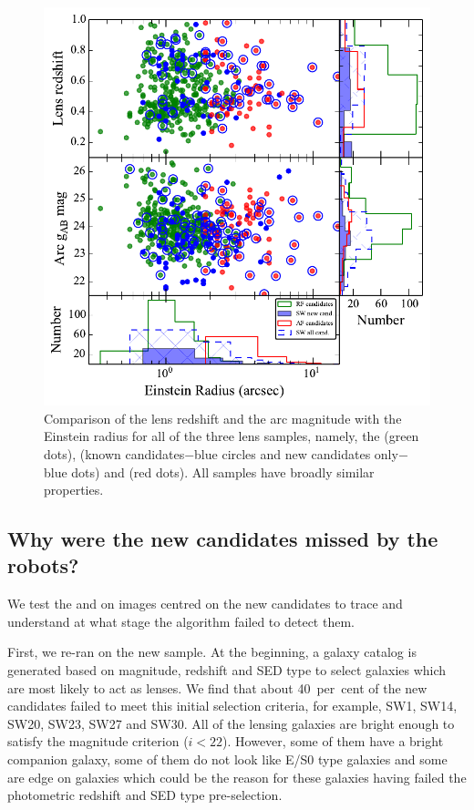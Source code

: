\documentclass[useAMS,usenatbib,a4paper]{mn2e}
\begin{document}
\begin{figure}
\begin{center}
\includegraphics[scale=0.65]{zl_mg_re.pdf}
\caption{ \label{fig:zlmgre}
Comparison of the lens redshift and the arc magnitude with the
Einstein radius for all of the three lens samples, namely, the \rf (green dots),
\sw (known candidates$-$blue circles and new candidates only$-$blue dots)
and \af (red dots). All samples have broadly similar properties.}
\end{center}
\end{figure}


\subsection{Why were the new \sw candidates missed by the robots?}

We test the \rf and \af on images centred on the new \sw candidates to
trace and understand at what stage the algorithm failed to detect them.

First, we re-ran \rf on the new \sw sample. At the beginning, a galaxy
catalog is generated based on magnitude, redshift and SED type
\citep[see]{Gavazzi2014} to select galaxies which are most likely to act
as lenses. We find that about 40~per~cent of the new \sw candidates failed to
meet this initial selection criteria, for example, SW1, SW14, SW20,
SW23, SW27 and SW30. All of the lensing galaxies are bright enough to
satisfy the magnitude criterion ($i<22$). However, some of them have a
bright companion galaxy, some of them do not look like E/S0 type
galaxies and some are edge on galaxies which could be the reason for
these galaxies having failed the photometric redshift and SED type pre-selection.
\end{document}
